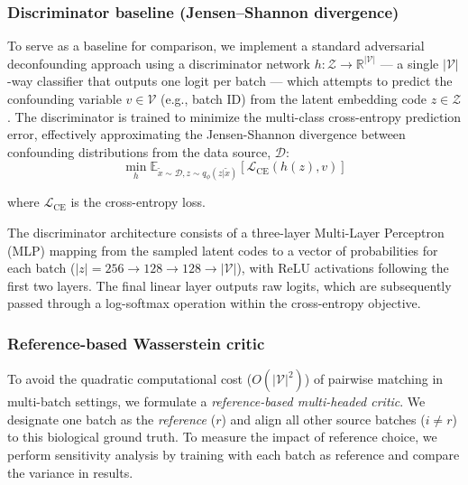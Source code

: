 \documentclass[unnumsec,webpdf,contemporary,large]{oup-authoring-template}%
\theoremstyle{thmstyleone}%
\theoremstyle{thmstyletwo}%
\theoremstyle{thmstylethree}%
\begin{document}
\subsubsection{Discriminator baseline (Jensen--Shannon divergence)}
To serve as a baseline for comparison, we implement a standard adversarial deconfounding approach using a discriminator network $h: \mathcal{Z}\rightarrow\mathbb{R}^{\lvert\mathcal{V}\rvert}$ --- a single $\lvert\mathcal{V}\rvert$-way classifier that outputs one logit per batch --- which attempts to predict the confounding variable $v \in \mathcal{V}$ (e.g., batch ID) from the latent embedding code $z \in \mathcal{Z}$. The discriminator is trained to minimize the multi-class cross-entropy prediction error, effectively approximating the Jensen-Shannon divergence between confounding distributions from the data source, $\mathcal{D}$:
\begin{equation*}
    \min_h \mathbb{E}_{\tilde{x} \sim \mathcal{D}, z \sim q_\phi(z|\tilde{x})} \left[ \mathcal{L}_{\text{CE}}(h(z), v) \right]
\end{equation*}

where $\mathcal{L}_{\text{CE}}$ is the cross-entropy loss.

The discriminator architecture consists of a three-layer Multi-Layer Perceptron (MLP) mapping from the sampled latent codes to a vector of probabilities for each batch ($\lvert z \rvert=256 \rightarrow 128 \rightarrow 128 \rightarrow \lvert \mathcal{V} \rvert$), with ReLU activations following the first two layers. The final linear layer outputs raw logits, which are subsequently passed through a log-softmax operation within the cross-entropy objective.

\subsubsection{Reference-based Wasserstein critic}\label{sec:refcritic}
To avoid the quadratic computational cost ($O(\lvert \mathcal{V} \rvert^2)$) of pairwise matching in multi-batch settings, we formulate a \textit{reference-based multi-headed critic}. We designate one batch as the \textit{reference} ($r$) and align all other source batches ($i \neq r$) to this biological ground truth. To measure the impact of reference choice, we perform sensitivity analysis by training with each batch as reference and compare the variance in results.
\end{document}
